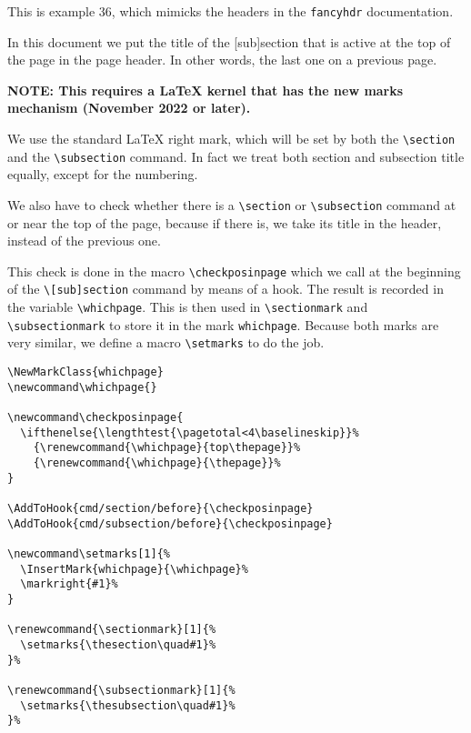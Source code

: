 \documentclass{article}
\newcommand\whichpage{}
\newcounter{thispage}
\newcommand\checkposinpage{
  \ifthenelse{\lengthtest{\pagetotal<4\baselineskip}}%
    {\renewcommand{\whichpage}{top\thepage}}%
    {\renewcommand{\whichpage}{\thepage}}%
  \setcounter{thispage}{\thepage}%
}
\newcommand\setmarks[1]{%
  \InsertMark{whichpage}{\whichpage}%
  \markright{#1}%
}
\renewcommand{\sectionmark}[1]{%
  \setmarks{\thesection\quad#1}%
}%
\renewcommand{\subsectionmark}[1]{%
  \setmarks{\thesubsection\quad#1}%
}%
\begin{document}
\pagestyle{intro}
\thispagestyle{contents}
\tableofcontents

\bigskip

\noindent
\begin{boxedminipage}{\textwidth}
This is example 36, which mimicks the headers in the \texttt{fancyhdr} documentation.

In this document we put the title of the [sub]section that is active at the top of the page in the page header. In other words, the last one on a previous page.

\textbf{NOTE: This requires a \LaTeX{} kernel that has the new marks mechanism (November 2022 or later).}

We use the standard \LaTeX{} right mark, which will be set by both the \verb|\section| and the \verb|\subsection| command. In fact we treat both section and subsection title equally, except for the numbering.

We also have to check whether there is a \verb|\section| or \verb|\subsection| command at or near the top of the page, because if there is, we take its title in the header, instead of the previous one.

This check is done in the macro \verb|\checkposinpage| which we call at the beginning of the \verb|\[sub]section| command by means of a hook. The result is recorded in the variable \verb|\whichpage|. This is then used in \verb|\sectionmark| and  \verb|\subsectionmark| to store it in the mark \texttt{whichpage}. Because both marks are very similar, we define a macro \verb|\setmarks| to do the job.

\begin{verbatim}
\NewMarkClass{whichpage}
\newcommand\whichpage{}

\newcommand\checkposinpage{
  \ifthenelse{\lengthtest{\pagetotal<4\baselineskip}}%
    {\renewcommand{\whichpage}{top\thepage}}%
    {\renewcommand{\whichpage}{\thepage}}%
}

\AddToHook{cmd/section/before}{\checkposinpage}
\AddToHook{cmd/subsection/before}{\checkposinpage}

\newcommand\setmarks[1]{%
  \InsertMark{whichpage}{\whichpage}%
  \markright{#1}%
}

\renewcommand{\sectionmark}[1]{%
  \setmarks{\thesection\quad#1}%
}%

\renewcommand{\subsectionmark}[1]{%
  \setmarks{\thesubsection\quad#1}%
}%
\end{verbatim}
\end{boxedminipage}
\end{document}
